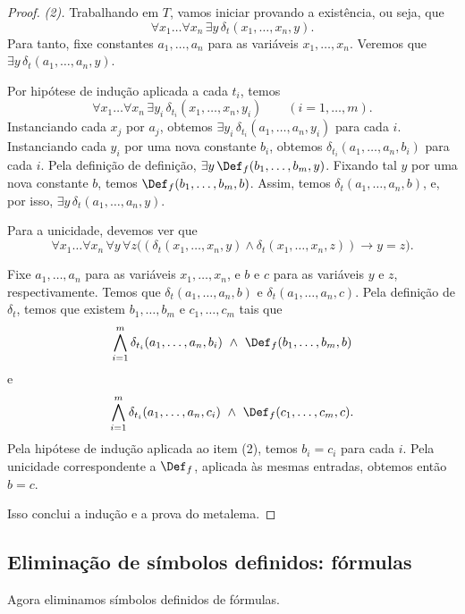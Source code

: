 \begin{proof}
\smallskip
\emph{(2).}
Trabalhando em $T$, vamos iniciar provando a existência, ou seja, que
\[
\forall x_1\ldots\forall x_n\,\exists y\,\delta_t(x_1,\ldots,x_n,y).
\]
Para tanto, fixe constantes $a_1,\ldots,a_n$ para as variáveis $x_1,\ldots,x_n$.
Veremos que $\exists y\,\delta_t(a_1,\ldots,a_n,y)$.

Por hipótese de indução aplicada a cada $t_i$, temos
\[
\forall x_1\ldots\forall x_n\,\exists y_i\,\delta_{t_i}(x_1,\ldots,x_n,y_i)\qquad (i=1,\ldots,m).
\]
Instanciando cada $x_j$ por $a_j$, obtemos $\exists y_i\,\delta_{t_i}(a_1,\ldots,a_n,y_i)$ para cada $i$.
Instanciando cada $y_i$ por uma nova constante $b_i$, obtemos $\delta_{t_i}(a_1,\ldots,a_n,b_i)$ para cada $i$.
Pela definição de definição, $\exists y\,\Def_f(b_1,\ldots,b_m,y)$.
Fixando tal $y$ por uma nova constante $b$, temos $\Def_f(b_1,\ldots,b_m,b)$.
Assim, temos $\delta_t(a_1,\ldots,a_n,b)$, e, por isso, $\exists y\,\delta_t(a_1,\ldots,a_n,y)$.

Para a unicidade, devemos ver que
\[
    \forall x_1\ldots\forall x_n\,\forall y\,\forall z\bigl((\delta_t(x_1,\ldots,x_n,y)\wedge \delta_t(x_1,\ldots,x_n,z))\rightarrow y=z\bigr).
\]

Fixe $a_1,\ldots,a_n$ para as variáveis $x_1,\ldots,x_n$, e $b$ e $c$ para as variáveis $y$ e $z$, respectivamente.
Temos que $\delta_t(a_1,\ldots,a_n,b)$ e $\delta_t(a_1,\ldots,a_n,c)$.
Pela definição de $\delta_t$, temos que existem $b_1,\ldots,b_m$ e $c_1,\ldots,c_m$ tais que
\[
\bigwedge_{i=1}^m \delta_{t_i}(a_1,\ldots,a_n,b_i)\ \wedge\ \Def_f(b_1,\ldots,b_m,b)
\]
e
\[
\bigwedge_{i=1}^m \delta_{t_i}(a_1,\ldots,a_n,c_i)\ \wedge\ \Def_f(c_1,\ldots,c_m,c).
\]
Pela hipótese de indução aplicada ao item (2), temos $b_i=c_i$ para cada $i$.
Pela unicidade correspondente a $\Def_f$, aplicada às mesmas entradas, obtemos então $b=c$.

Isso conclui a indução e a prova do metalema.
\end{proof}

\subsection{Eliminação de símbolos definidos: fórmulas}\label{subsec:eliminacaoSimbolosDefinidosFormulas}

Agora eliminamos símbolos definidos de fórmulas.

